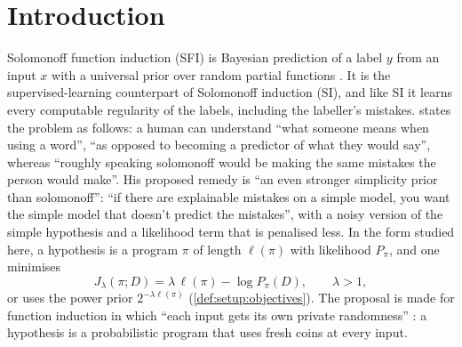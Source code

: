 \section{Introduction}\label{sec:intro}

Solomonoff function induction (SFI) is Bayesian prediction of a label $y$ from an input $x$ with a universal prior over random partial functions \citep{hanni2026notes,claudeSFI2026fundamentals}. It is the supervised-learning counterpart of Solomonoff induction (SI), and like SI it learns every computable regularity of the labels, including the labeller's mistakes.  states the problem as follows: a human can understand ``what someone means when using a word'', ``as opposed to becoming a predictor of what they would say'', whereas ``roughly speaking solomonoff would be making the same mistakes the person would make''. His proposed remedy is ``an even stronger simplicity prior than solomonoff'': ``if there are explainable mistakes on a simple model, you want the simple model that doesn't predict the mistakes'', with a noisy version of the simple hypothesis and a likelihood term that is penalised less. In the form studied here, a hypothesis is a program $\pi$ of length $\ell(\pi)$ with likelihood $P_\pi$, and one minimises
\[
J_\lambda(\pi;D)=\lambda\,\ell(\pi)-\log P_\pi(D),\qquad\lambda>1,
\]
or uses the power prior $2^{-\lambda\ell(\pi)}$ (\cref{def:setup:objectives}). The proposal is made for function induction in which ``each input gets its own private randomness'' \citep{hanni2026lesswrong}: a hypothesis is a probabilistic program that uses fresh coins at every input.

